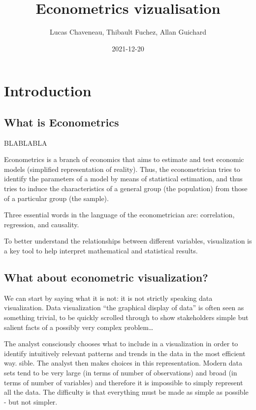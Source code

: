 \documentclass[
]{report}
\title{Econometrics vizualisation}
\author{Lucas Chaveneau, Thibault Fuchez, Allan Guichard}
\date{2021-12-20}
\begin{document}
\maketitle

{
\setcounter{tocdepth}{1}
\tableofcontents
}
\hypertarget{introduction}{%
\chapter{Introduction}\label{introduction}}

\hypertarget{what-is-econometrics}{%
\section{What is Econometrics}\label{what-is-econometrics}}

BLABLABLA

Econometrics is a branch of economics that aims to estimate and test economic models (simplified representation of reality). Thus, the econometrician tries to identify the parameters of a model by means of statistical estimation, and thus tries to induce the characteristics of a general group (the population) from those of a particular group (the sample).

Three essential words in the language of the econometrician are: correlation, regression, and causality.

To better understand the relationships between different variables, visualization is a key tool to help interpret mathematical and statistical results.

\hypertarget{what-about-econometric-visualization}{%
\section{What about econometric visualization?}\label{what-about-econometric-visualization}}

We can start by saying what it is not: it is not strictly speaking data visualization.
Data visualization ``the graphical display of data'' is often seen as something trivial, to be quickly scrolled through to show stakeholders simple but salient facts of a possibly very complex problem\ldots{}

The analyst consciously chooses what to include in a visualization in order to identify intuitively relevant patterns and trends in the data in the most efficient way. sible. The analyst then makes choices in this representation. Modern data sets tend to be very large (in terms of number of observations) and broad (in terms of number of variables) and therefore it is impossible to simply represent all the data. The difficulty is that everything must be made as simple as possible - but not simpler.
\end{document}
